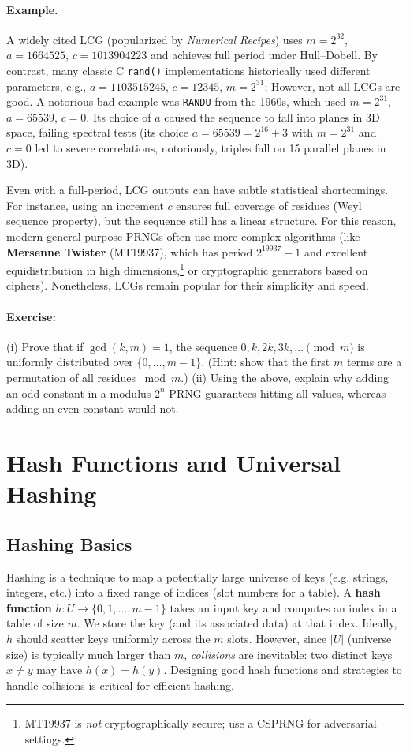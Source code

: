 \documentclass[11pt]{article}
\begin{document}
\paragraph{Example.} A widely cited LCG (popularized by \emph{Numerical Recipes}) uses $m=2^{32}$, $a=1664525$, $c=1013904223$ and achieves full period under Hull–Dobell. By contrast, many classic C \texttt{rand()} implementations historically used different parameters, e.g., $a=1103515245$, $c=12345$, $m=2^{31}$; However, not all LCGs are good. A notorious bad example was \texttt{RANDU} from the 1960s, which used $m=2^{31}$, $a=65539$, $c=0$. Its choice of $a$ caused the sequence to fall into planes in 3D space, failing spectral tests (its choice $a=65539=2^{16}+3$ with $m=2^{31}$ and $c=0$ led to severe correlations, notoriously, triples fall on 15 parallel planes in 3D).

Even with a full-period, LCG outputs can have subtle statistical shortcomings. For instance, using an increment $c$ ensures full coverage of residues (Weyl sequence property), but the sequence still has a linear structure. For this reason, modern general-purpose PRNGs often use more complex algorithms (like \textbf{Mersenne Twister} (MT19937), which has period $2^{19937}-1$ and excellent equidistribution in high dimensions,\footnote{MT19937 is \emph{not} cryptographically secure; use a CSPRNG for adversarial settings.} or cryptographic generators based on ciphers). Nonetheless, LCGs remain popular for their simplicity and speed. 

\paragraph{Exercise:} (i) Prove that if $\gcd(k,m)=1$, the sequence $0, k, 2k, 3k, \ldots \pmod m$ is uniformly distributed over $\{0,\ldots,m-1\}$. (Hint: show that the first $m$ terms are a permutation of all residues $ \bmod m$.) (ii) Using the above, explain why adding an odd constant in a modulus $2^n$ PRNG guarantees hitting all values, whereas adding an even constant would not.

\section{Hash Functions and Universal Hashing}
\label{sec:hashing}
\subsection{Hashing Basics}
Hashing is a technique to map a potentially large universe of keys (e.g. strings, integers, etc.) into a fixed range of indices (slot numbers for a table). A \textbf{hash function} $h: U \to \{0,1,\ldots, m-1\}$ takes an input key and computes an index in a table of size $m$. We store the key (and its associated data) at that index. Ideally, $h$ should scatter keys uniformly across the $m$ slots. However, since $|U|$ (universe size) is typically much larger than $m$, \emph{collisions} are inevitable: two distinct keys $x \neq y$ may have $h(x)=h(y)$. Designing good hash functions and strategies to handle collisions is critical for efficient hashing.
\end{document}
